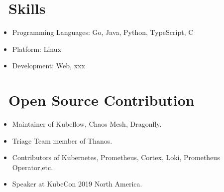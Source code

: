 \documentclass{resume}
\begin{document}
\section{\faKey\ Skills}
\begin{itemize}[parsep=0.5ex]
  \item Programming Languages: Go, Java, Python, TypeScript, C
  \item Platform: Linux
  \item Development: Web, xxx
\end{itemize}

\section{\faInfo\ Open Source Contribution}
\begin{itemize}[parsep=0.5ex]
  \item Maintainer of Kubeflow, Chaos Mesh, Dragonfly.
  \item Triage Team member of Thanos.
  \item Contributors of Kubernetes, Prometheus, Cortex, Loki, Prometheus Operator,etc.
  \item Speaker at KubeCon 2019 North America.
\end{itemize}
\end{document}
